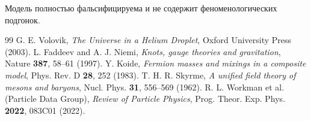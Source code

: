 \documentclass[12pt,a4paper]{article}
\begin{document}
			Модель полностью фальсифицируема и не содержит феноменологических подгонок.
			
			\begin{thebibliography}{99}
				 G. E. Volovik, \textit{The Universe in a Helium Droplet}, Oxford University Press (2003).
				 L. Faddeev and A. J. Niemi, \textit{Knots, gauge theories and gravitation}, Nature \textbf{387}, 58--61 (1997).
				 Y. Koide, \textit{Fermion masses and mixings in a composite model}, Phys. Rev. D \textbf{28}, 252 (1983).
				 T. H. R. Skyrme, \textit{A unified field theory of mesons and baryons}, Nucl. Phys. \textbf{31}, 556--569 (1962).
				 R. L. Workman et al. (Particle Data Group), \textit{Review of Particle Physics}, Prog. Theor. Exp. Phys. \textbf{2022}, 083C01 (2022).
			\end{thebibliography}
			
		
\end{document}
